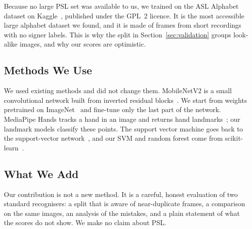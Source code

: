 Because no large PSL set was available to us, we trained on the ASL Alphabet dataset on Kaggle~\cite{asl_alphabet_kaggle}, published under the GPL~2 licence. It is the most accessible large alphabet dataset we found, and it is made of frames from short recordings with no signer labels. This is why the split in Section~\ref{sec:validation} groups look-alike images, and why our scores are optimistic.

\subsection{Methods We Use}

We used existing methods and did not change them. MobileNetV2 is a small convolutional network built from inverted residual blocks~\cite{sandler2018mobilenetv2}. We start from weights pretrained on ImageNet~\cite{deng2009imagenet} and fine-tune only the last part of the network. MediaPipe Hands tracks a hand in an image and returns hand landmarks~\cite{zhang2020mediapipe}; our landmark models classify these points. The support vector machine goes back to the support-vector network~\cite{cortes1995svm}, and our SVM and random forest come from scikit-learn~\cite{pedregosa2011sklearn}.

\subsection{What We Add}

Our contribution is not a new method. It is a careful, honest evaluation of two standard recognisers: a split that is aware of near-duplicate frames, a comparison on the same images, an analysis of the mistakes, and a plain statement of what the scores do not show. We make no claim about PSL.
